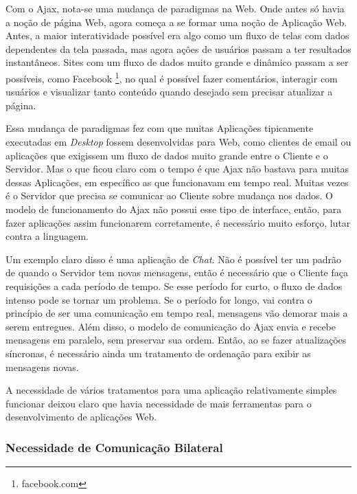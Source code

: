 \documentclass[a4paper,12pt]{article}
\begin{document}
Com o Ajax, nota-se uma mudança de paradigmas na Web. Onde antes só havia a noção de página Web, agora começa a se formar uma noção de Aplicação Web. Antes, a maior interatividade possível era algo como um fluxo de telas com dados dependentes da tela passada, mas agora ações de usuários passam a ter resultados instantâneos. Sites com um fluxo de dados muito grande e dinâmico passam a ser possíveis, como Facebook \footnote{facebook.com}, no qual é possível fazer comentários, interagir com usuários e visualizar tanto conteúdo quando desejado sem precisar atualizar a página.

Essa mudança de paradigmas fez com que muitas Aplicações tipicamente executadas em \emph{Desktop} fossem desenvolvidas para Web, como clientes de email ou aplicações que exigissem um fluxo de dados muito grande entre o Cliente e o Servidor. Mas o que ficou claro com o tempo é que Ajax não bastava para muitas dessas Aplicações, em específico as que funcionavam em tempo real. Muitas vezes é o Servidor que precisa se comunicar ao Cliente sobre mudança nos dados. O modelo de funcionamento do Ajax não possui esse tipo de interface, então, para fazer aplicações assim funcionarem corretamente, é necessário muito esforço, lutar contra a linguagem.

Um exemplo claro disso é uma aplicação de \emph{Chat}. Não é possível ter um padrão de quando o Servidor tem novas mensagens, então é necessário que o Cliente faça requisições a cada período de tempo. Se esse período for curto, o fluxo de dados intenso pode se tornar um problema. Se o período for longo, vai contra o princípio de ser uma comunicação em tempo real, mensagens vão demorar mais a serem entregues. Além disso, o modelo de comunicação do Ajax envia e recebe mensagens em paralelo, sem preservar sua ordem. Então, ao se fazer atualizações síncronas, é necessário ainda um tratamento de ordenação para exibir as mensagens novas.

A necessidade de vários tratamentos para uma aplicação relativamente simples funcionar deixou claro que havia necessidade de mais ferramentas para o desenvolvimento de aplicações Web.


\subsubsection{Necessidade de Comunicação Bilateral}
\end{document}
